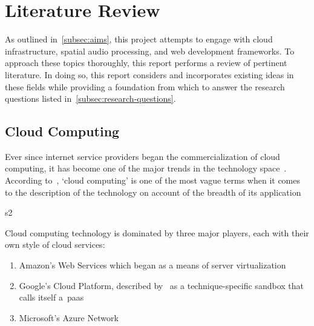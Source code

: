 
\thispagestyle{plain}
\newpage
\section{Literature Review}\label{sec:literature-review}

\normalsize

As outlined in~\ref{subsec:aims}, this project attempts to engage with cloud infrastructure, spatial audio processing, and web development frameworks.
To approach these topics thoroughly, this report performs a review of pertinent literature.
In doing so, this report considers and incorporates existing ideas in these fields while providing a foundation from which to answer the research questions listed in~\ref{subsec:research-questions}.

\subsection{Cloud Computing}\label{subsec:cloud-computing}

Ever since internet service providers began the commercialization of cloud computing, it has become one of the major trends in the technology space~\citep{cc_overview}.
According to~\citet{cc_overview}, `cloud computing' is one of the most vague terms when it comes to the description of the technology on account of the breadth of its application


s2\citep{cc_challenges}

Cloud computing technology is dominated by three major players, each with their own style of cloud services:
\begin{enumerate}
    \item Amazon's Web Services which began as a means of server virtualization~\citep{awsintro}
    \item Google's Cloud Platform, described by~\citet{cc_overview} as a technique-specific sandbox that calls itself a~\gls{paas}~\citep{googlecloudintro}
    \item Microsoft's Azure Network~\citep{azurefundamentals}
\end{enumerate}




